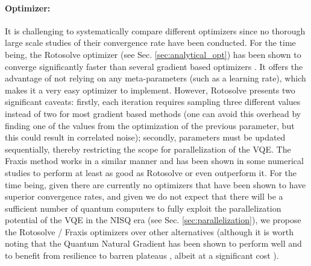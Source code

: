 \paragraph{Optimizer:} It is challenging to systematically compare different optimizers since no thorough large scale studies of their convergence rate have been conducted. For the time being, the Rotosolve optimizer \cite{Vidal2018,nakanishi_sequential_2020,ostaszewskiStructureOptimizationParameterized2021} (see Sec. \ref{sec:analytical_opt}) has been shown to converge significantly faster than several gradient based optimizers \cite{ostaszewskiStructureOptimizationParameterized2021}. It offers the advantage of not relying on any meta-parameters (such as a learning rate), which makes it a very easy optimizer to implement. However, Rotosolve presents two significant caveats: firstly, each iteration requires sampling three different values instead of two for most gradient based methods (one can avoid this overhead by finding one of the values from the optimization of the previous parameter, but this could result in correlated noise); secondly, parameters must be updated sequentially, thereby restricting the scope for parallelization of the VQE. The Fraxis method \cite{Watanabe2021WatanabeOptimizingSelection, Wada2021SimulatingCircuits} works in a similar manner and has been shown in some numerical studies to perform at least as good as Rotosolve or even outperform it. For the time being, given there are currently no optimizers that have been shown to have superior convergence rates, and given we do not expect that there will be a sufficient number of quantum computers to fully exploit the parallelization potential of the VQE in the NISQ era (see Sec. \ref{sec:parallelization}), we propose the Rotosolve / Fraxis optimizers over other alternatives (although it is worth noting that the Quantum Natural Gradient \cite{koczor_quantum_2020} has been shown to perform well and to benefit from resilience to barren plateaus \cite{stokes_quantum_2020,McArdle2019}, albeit at a significant cost \cite{koczor_quantum_2020}). 

